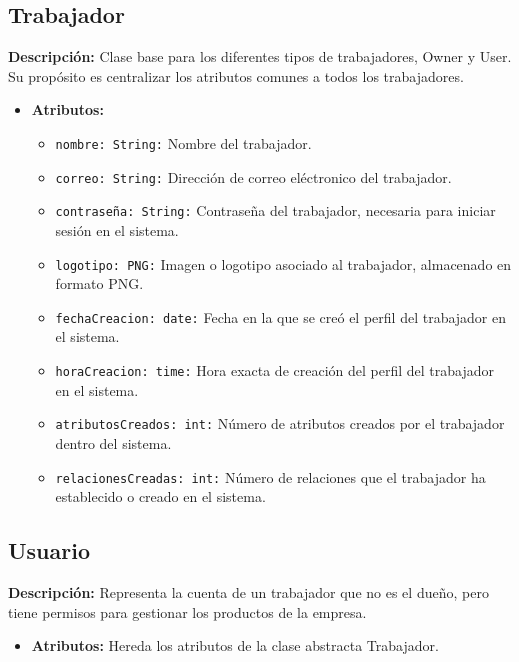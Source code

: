 \documentclass[12pt.a4paper]{article}
\begin{document}
\subsection{Trabajador}
     \textbf{Descripción:}  Clase base para los diferentes tipos de trabajadores, Owner y User. Su propósito es centralizar los atributos comunes a todos los trabajadores.

    \begin{itemize}
        \item {\textbf{Atributos:}}
        \begin{itemize}
            \item \texttt{nombre: String:} Nombre del trabajador.
            \item \texttt{correo: String:} Dirección de correo eléctronico del trabajador.
            \item \texttt{contraseña: String:} Contraseña del trabajador, necesaria para iniciar sesión en el sistema. 
            \item \texttt{logotipo: PNG:} Imagen o logotipo asociado al trabajador, almacenado en formato PNG.
            \item \texttt{fechaCreacion: date:} Fecha en la que se creó el perfil del trabajador en el sistema.
            \item \texttt{horaCreacion: time:} Hora exacta de creación del perfil del trabajador en el sistema. 
            \item \texttt{atributosCreados: int:} Número de atributos creados por el trabajador dentro del sistema. 
            \item \texttt{relacionesCreadas: int:} Número de relaciones que el trabajador ha establecido o creado en el sistema.
        \end{itemize}
    \end{itemize}
    
\subsection{Usuario}
     \textbf{Descripción:} Representa la cuenta de un trabajador que no es el dueño, pero tiene permisos para gestionar los productos de la empresa.
    \begin{itemize}
        \item {\textbf{Atributos:}} Hereda los atributos de la clase abstracta Trabajador.
    \end{itemize}
\end{document}
